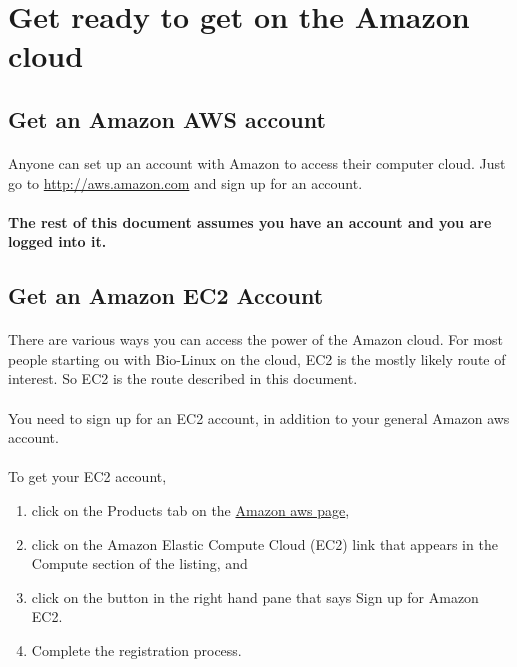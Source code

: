 \section{Get ready to get on the Amazon cloud}

\subsection{Get an Amazon AWS account}

\paragraph{}Anyone can set up an account with Amazon to access their computer cloud. Just go to \href{http://aws.amazon.com}{http://aws.amazon.com} and sign up for an account. 

\paragraph{The rest of this document assumes you have an account and you are logged into it.}



\subsection{Get an Amazon EC2 Account}

\paragraph{}There are various ways you can access the power of the Amazon cloud. For most people starting ou with Bio-Linux on the cloud, EC2 is the mostly likely route of interest. So EC2 is the route described in this document. 

\paragraph{}You need to sign up for an EC2 account, in addition to your general Amazon aws account. 

\paragraph{}To get your EC2 account, 
\begin{enumerate}
\item click on the Products tab on the \href{http://aws.amazon.com}{Amazon aws page},
\item click on the Amazon Elastic Compute Cloud (EC2) link that appears in the Compute section of the listing, and
\item click on the button in the right hand pane that says Sign up for Amazon EC2.  
\item Complete the registration process.
\end{enumerate}

